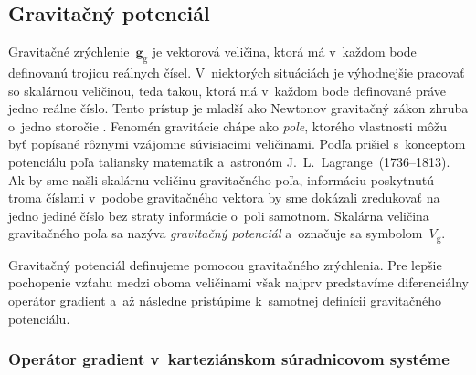 \documentclass[a4paper,12pt]{book}
\newcommand{\gidx}{\mathrm g}
\let\vec\mathbf
\begin{document}
\subsection{Gravitačný potenciál}
\label{sec:vg}

Gravitačné zrýchlenie~$\vec g_\gidx$ je vektorová veličina, ktorá má v~každom 
bode definovanú trojicu reálnych čísel.  V~niektorých situáciách je výhodnejšie 
pracovať so skalárnou veličinou, teda takou, ktorá má v~každom bode definované 
práve jedno reálne číslo.  Tento prístup je mladší ako Newtonov gravitačný 
zákon zhruba o~jedno storočie \parencite{MacMillan1930,Jekeli2015}.  Fenomén 
gravitácie chápe ako \emph{pole}, ktorého vlastnosti môžu byť popísané rôznymi 
vzájomne súvisiacimi veličinami.  Podľa \textcite{MacMillan1930} prišiel 
s~konceptom potenciálu poľa taliansky matematik a~astronóm 
J.~L.~Lagrange~(1736--1813).  Ak by sme našli skalárnu veličinu gravitačného 
poľa, informáciu poskytnutú troma číslami v~podobe gravitačného vektora by sme 
dokázali zredukovať na jedno jediné číslo bez straty informácie o~poli 
samotnom.  Skalárna veličina gravitačného poľa sa nazýva \emph{gravitačný 
potenciál} a~označuje sa symbolom~$V_\gidx$.

Gravitačný potenciál definujeme pomocou gravitačného zrýchlenia.  Pre lepšie 
pochopenie vzťahu medzi oboma veličinami však najprv predstavíme diferenciálny 
operátor gradient a~až následne pristúpime k~samotnej definícii gravitačného 
potenciálu.

\subsubsection{Operátor gradient v~karteziánskom súradnicovom systéme}
\end{document}
